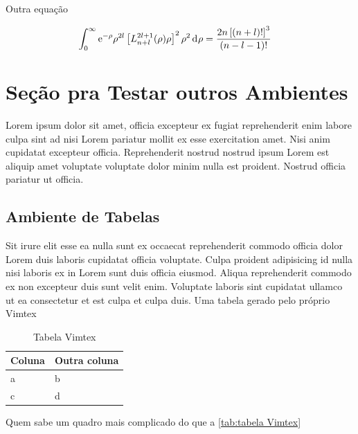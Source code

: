 Outra equação

\begin{align}
  \displaystyle\int_{0}^{\infty}\E^{-\rho}\rho^{2l}\left[L^{2l+1}_{n+l}(\rho)\rho\right]^{2}\rho^{2}\dif{\rho}&=\frac{2n\left[(n+l)!\right]^{3}}{(n-l-1)!}
\end{align}

\section{Seção pra Testar outros Ambientes} %
\label{sec:Seção pra Testar outros Ambientes}

Lorem ipsum dolor sit amet, officia excepteur ex fugiat reprehenderit enim labore culpa sint ad nisi Lorem pariatur mollit ex esse exercitation amet. Nisi anim cupidatat excepteur officia. Reprehenderit nostrud nostrud ipsum Lorem est aliquip amet voluptate voluptate dolor minim nulla est proident. Nostrud officia pariatur ut officia.

\subsection{Ambiente de Tabelas} %
\label{sub:Ambiente de Tabelas}

Sit irure elit esse ea nulla sunt ex occaecat reprehenderit commodo officia dolor Lorem duis laboris cupidatat officia voluptate. Culpa proident adipisicing id nulla nisi laboris ex in Lorem sunt duis officia eiusmod. Aliqua reprehenderit commodo ex non excepteur duis sunt velit enim. Voluptate laboris sint cupidatat ullamco ut ea consectetur et est culpa et culpa duis. Uma tabela gerado pelo próprio Vimtex

\begin{table}[!ht]
  \caption{Tabela Vimtex}
  \label{tab:tabela Vimtex}
  \begin{center}
	 \begin{tabular}[c]{l|l}
		\hline
		\multicolumn{1}{c|}{\textbf{Coluna}} & 
		\multicolumn{1}{c}{\textbf{Outra coluna}} \\
		\hline
		a & b \\
		c & d \\
		\hline
	 \end{tabular}
  \end{center}
\end{table}

Quem sabe um quadro mais complicado do que a \autoref{tab:tabela Vimtex}

